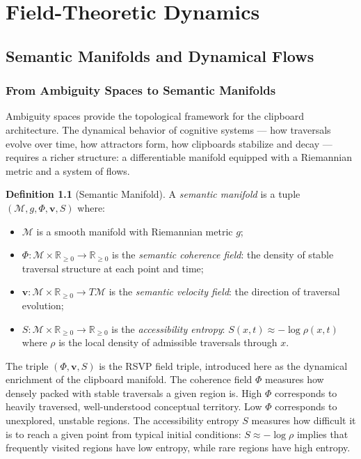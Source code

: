 \documentclass[12pt,oneside]{book}
\theoremstyle{plain}
\theoremstyle{definition}
\newtheorem{definition}[theorem]{Definition}
\theoremstyle{plain}
\newcommand{\cM}{\mathcal{M}}
\begin{document}
\part{Field-Theoretic Dynamics}

\chapter{Semantic Manifolds and Dynamical Flows}
\label{ch:manifolds}

\section{From Ambiguity Spaces to Semantic Manifolds}

Ambiguity spaces provide the topological framework for the clipboard architecture. The dynamical behavior of cognitive systems — how traversals evolve over time, how attractors form, how clipboards stabilize and decay — requires a richer structure: a differentiable manifold equipped with a Riemannian metric and a system of flows.

\begin{definition}[Semantic Manifold]
A \emph{semantic manifold} is a tuple $(\cM, g, \Phi, \mathbf{v}, S)$ where:
\begin{itemize}[noitemsep]
\item $\cM$ is a smooth manifold with Riemannian metric $g$;
\item $\Phi : \cM \times \mathbb{R}_{\geq 0} \to \mathbb{R}_{\geq 0}$ is the \emph{semantic coherence field}: the density of stable traversal structure at each point and time;
\item $\mathbf{v} : \cM \times \mathbb{R}_{\geq 0} \to T\cM$ is the \emph{semantic velocity field}: the direction of traversal evolution;
\item $S : \cM \times \mathbb{R}_{\geq 0} \to \mathbb{R}_{\geq 0}$ is the \emph{accessibility entropy}: $S(x,t) \approx -\log \rho(x,t)$ where $\rho$ is the local density of admissible traversals through $x$.
\end{itemize}
\end{definition}

The triple $(\Phi, \mathbf{v}, S)$ is the RSVP field triple, introduced here as the dynamical enrichment of the clipboard manifold. The coherence field $\Phi$ measures how densely packed with stable traversals a given region is. High $\Phi$ corresponds to heavily traversed, well-understood conceptual territory. Low $\Phi$ corresponds to unexplored, unstable regions. The accessibility entropy $S$ measures how difficult it is to reach a given point from typical initial conditions: $S \approx -\log \rho$ implies that frequently visited regions have low entropy, while rare regions have high entropy.
\end{document}

